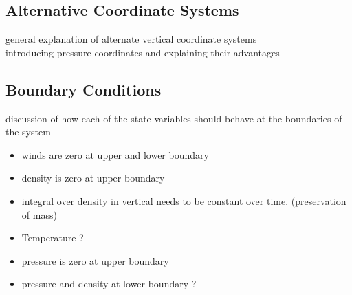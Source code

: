 \subsection{Alternative Coordinate Systems}
general explanation of alternate vertical coordinate systems\\
introducing pressure-coordinates and explaining their advantages
\subsection{Boundary Conditions}
discussion of how each of the state variables should behave at the boundaries of the system
\begin{itemize}
\item winds are zero at upper and lower boundary
\item density is zero at upper boundary
\item integral over density in vertical needs to be constant over time. (preservation of mass)
\item Temperature ?
\item pressure is zero at upper boundary
\item pressure and density at lower boundary ?
\end{itemize}

